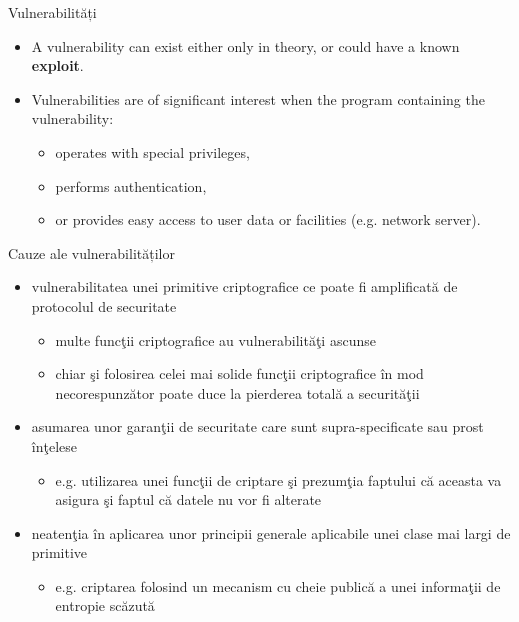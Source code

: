 \documentclass[pdf]{beamer}
\begin{document}
\begin{frame}{Vulnerabilități}
\begin{itemize}
\item
A vulnerability can exist either only in theory, or could have a known \textbf{exploit}. 
\item
Vulnerabilities are of significant interest when the program containing the vulnerability:
\begin{itemize}
\item
operates with special privileges,
\item
performs authentication,
\item
or provides easy access to user data or facilities (e.g. network server).
\end{itemize}
\end{itemize}
\end{frame}



\begin{frame}{Cauze ale vulnerabilităților}
\begin{itemize}
\item
vulnerabilitatea unei primitive criptografice ce poate fi amplificată de protocolul de securitate 
\begin{itemize}
\item
multe funcţii criptografice au vulnerabilităţi ascunse
\item
chiar şi folosirea celei mai solide funcţii criptografice în mod necorespunzător poate duce la pierderea totală a securităţii
\end{itemize}

\item
asumarea unor garanţii de securitate care sunt supra-specificate sau prost înţelese 
\begin{itemize}
\item
e.g. utilizarea unei funcţii de criptare şi prezumţia faptului că aceasta va asigura şi faptul că datele nu vor fi alterate
\end{itemize}

\item
neatenţia în aplicarea unor principii generale aplicabile unei clase mai largi de primitive 
\begin{itemize}
\item
e.g. criptarea folosind un mecanism cu cheie publică a unei informaţii de entropie scăzută
\end{itemize}
\end{itemize}
\end{frame}
\end{document}
